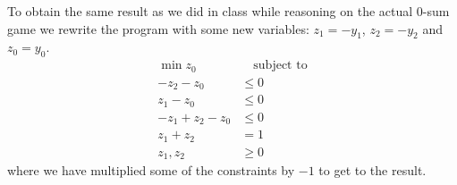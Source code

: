 \documentclass[12pt]{extarticle}
\numberwithin{equation}{section}
\begin{document}
To obtain the same result as we did in class while reasoning on the actual 0-sum game we rewrite
the program with some new variables: $z_1 = -y_1$, $z_2 = -y_2$ and $z_0 = y_0$.
\begin{align}
	\min z_0          & \quad \text{subject to} \\
	-z_2 - z_0        & \leq 0                  \\
	z_1 - z_0         & \leq 0                  \\
	- z_1 + z_2 - z_0 & \leq 0                  \\
	z_1 + z_2         & = 1                     \\
	z_1, z_2          & \geq 0
\end{align}
where we have multiplied some of the constraints by $-1$ to get to the result.
\end{document}
